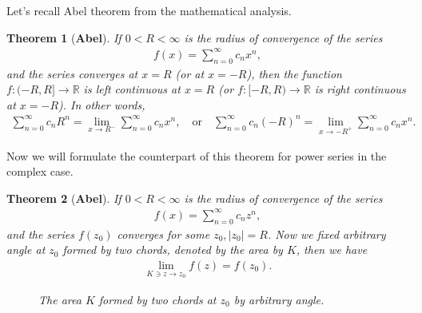 \documentclass[11pt]{book}
\newtheorem{theorem}{Theorem}[chapter]
\theoremstyle{definition}
\numberwithin{equation}{chapter}
\begin{document}
\medskip

Let's recall Abel theorem from the mathematical analysis.

\medskip

\begin{theorem}[{\bf Abel}]\label{th_85}
If $0 < R < \infty$ is the radius of convergence of the series
\begin{align*}
    f(x) = \sum^\infty_{n=0} c_n x^n,
\end{align*}
and the series converges at $x = R$ (or at $x = -R$), then the function $f:(-R,R] \to \mathbb{R}$ is left continuous at $x = R$ (or $f:[-R,R) \to \mathbb{R}$ is right continuous at $x = -R$). In other words,
\begin{align*}
    \sum^\infty_{n=0} c_n R^n = \lim_{x \to R^-} \sum^\infty_{n=0} c_n x^n, \quad \text{or} \quad \sum^\infty_{n=0} c_n (-R)^n = \lim_{x \to -R^+} \sum^\infty_{n=0} c_n x^n.
\end{align*}
\end{theorem}

\medskip

Now we will formulate the counterpart of this theorem for power series in the complex case.

\medskip

\begin{theorem}[{\bf Abel}]\label{th_86}
If $0 < R < \infty$ is the radius of convergence of the series
\begin{align*}
    f(x) = \sum^\infty_{n=0} c_n z^n,
\end{align*}
and the series $f(z_0)$ converges for some $z_0, \left|z_0\right| = R$. Now we fixed arbitrary angle at $z_0$ formed by two chords, denoted by the area by $K$, then we have
\begin{align*}
    \lim_{K \ni z \to z_0} f(z) = f(z_0).
\end{align*}
\begin{figure}[H]
    \centering
    \caption{The area $K$ formed by two chords at $z_0$ by arbitrary angle.}
    \label{fig:chords}
\end{figure}
\end{theorem}


\medskip
\end{document}
